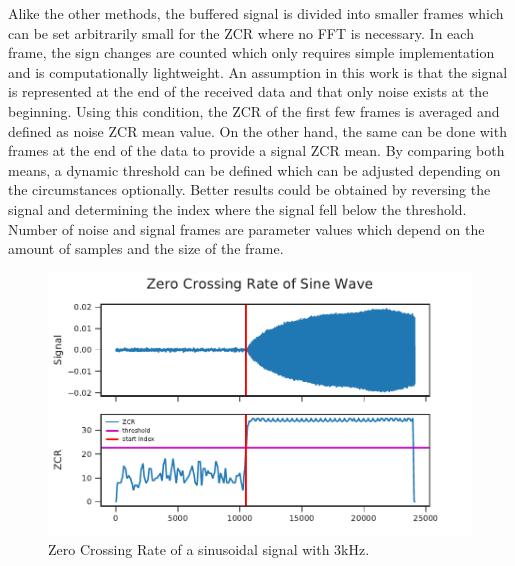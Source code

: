 Alike the other methods, the buffered signal is divided into smaller frames
which can be set arbitrarily small for the \ac{ZCR} where no \ac{FFT} is necessary.
In each frame, the sign changes are counted which only requires simple implementation
and is computationally lightweight.
An assumption in this work is that the signal is represented at the
end of the received data and that only noise exists at the beginning.
Using this condition, the \ac{ZCR} of the first few frames is averaged and
defined as noise \ac{ZCR} mean value.
On the other hand, the same can be done with frames at the end of the data to
provide a signal \ac{ZCR} mean.
By comparing both means, a dynamic threshold can be defined which can be
adjusted depending on the circumstances optionally.
Better results could be obtained by reversing the signal and
determining the index where the signal fell below the threshold.
Number of noise and signal frames are parameter values which depend
on the amount of samples and the size of the frame.
\begin{figure}[ht]
	\centering
		\includegraphics[]{figures/sine_zcr}
	\caption{Zero Crossing Rate of a sinusoidal signal with 3\si{\kilo\hertz}.}
	\label{fig:03_zcr}
\end{figure}
